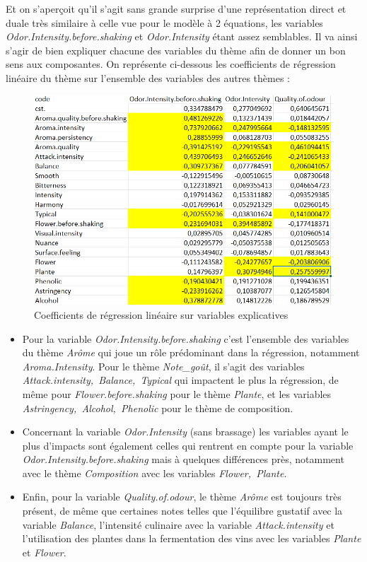 \documentclass[a4paper,french,10pt]{article}
\begin{document}
Et on s'aperçoit qu'il s'agit sans grande surprise d'une représentation direct et duale très similaire à celle vue pour le modèle à 2 équations, les variables \textit{Odor.Intensity.before.shaking} et \textit{Odor.Intensity} étant assez semblables. Il va ainsi s'agir de bien expliquer chacune des variables du thème afin de donner un bon sens aux composantes. \newline 
On représente ci-dessous les coefficients de régression linéaire du thème sur l'ensemble des variables des autres thèmes : 

\begin{figure}[htp] 
	\centering
	\includegraphics[scale=0.45]{images/Coeff_var_Cross.png}
	\caption{Coefficients de régression linéaire sur variables explicatives}
\end{figure}

\begin{itemize}
	\item Pour la variable \textit{Odor.Intensity.before.shaking} c'est l'ensemble des variables du thème \textit{Arôme} qui joue un rôle prédominant dans la régression, notamment \textit{Aroma.Intensity}. Pour le thème \textit{Note\_goût}, il s'agit des variables \textit{Attack.intensity,~Balance,~Typical} qui impactent le plus la régression, de même pour \textit{Flower.before.shaking} pour le thème \textit{Plante}, et les variables \textit{Astringency,~Alcohol,~Phenolic} pour le thème de composition. 
	\item Concernant la variable \textit{Odor.Intensity} (sans brassage) les variables ayant le plus d'impacts sont également celles qui rentrent en compte pour la variable \textit{Odor.Intensity.before.shaking} mais à quelques différences près, notamment avec le thème \textit{Composition} avec les variables \textit{Flower,~Plante}.
	\item Enfin, pour la variable \textit{Quality.of.odour}, le thème \textit{Arôme} est toujours très présent, de même que certaines notes telles que l'équilibre gustatif avec la variable \textit{Balance}, l'intensité culinaire avec la variable \textit{Attack.intensity} et l'utilisation des plantes dans la fermentation des vins avec les variables \textit{Plante} et \textit{Flower}. 
\end{itemize}
\end{document}
